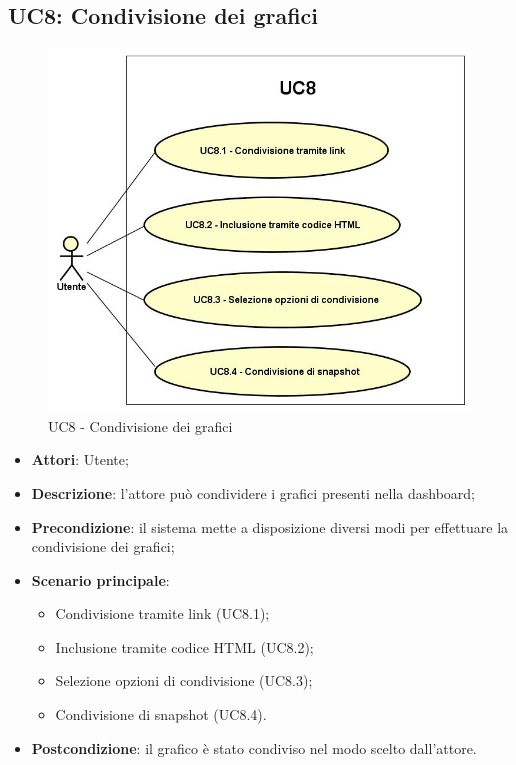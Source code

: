 \subsection{UC8: Condivisione dei grafici}
\hypertarget{UC8}{}
\begin{figure} [H]
	\centering
	\includegraphics[scale=0.45]{Img/UC8}
	\caption{UC8 - Condivisione dei grafici}\label{}
\end{figure}
\begin{itemize}
	\item \textbf{Attori}: Utente;
	\item \textbf{Descrizione}: l'attore può condividere i grafici presenti nella dashboard;
	\item \textbf{Precondizione}: il sistema mette a disposizione diversi modi per effettuare la condivisione dei grafici;
	\item \textbf{Scenario principale}:
	\begin{itemize}
		\item Condivisione tramite link (UC8.1);
		\item Inclusione tramite codice HTML (UC8.2);
		\item Selezione opzioni di condivisione (UC8.3);	
		\item Condivisione di snapshot (UC8.4).
	\end{itemize}
	\item \textbf{Postcondizione}: il grafico è stato condiviso nel modo scelto dall'attore.
	
\end{itemize}


